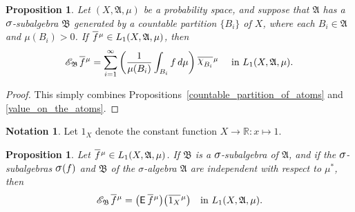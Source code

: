 \documentclass[
twoside=true,
paper=letter,
fontsize=9pt,
pagesize=auto,
leqno,
openany,
headsepline,
overfullrule,
]{scrbook}
\theoremstyle{plain}
\theoremstyle{plain}
\newtheorem{prop}[thm]{Proposition}
\theoremstyle{definition}
\newtheorem{notn}[thm]{Notation}
\theoremstyle{bfnoteitalic}
\theoremstyle{bfnoteroman}
\newcommand{\sigalg}[1]{\mathfrak{#1}}
\newcommand{\cali}[1]{\mathscr{#1}}
\newcommand{\sfop}[1]{\mathsf{#1}}
\newcommand{\expval}{\sfop{E}\,}
\newcommand{\condexpsub}[2]
{\mathop{\cali{E}\hspace{-1.5pt}}\nolimits_{#2}\hspace{-1pt}#1}
\newcommand{\sagb}{\mathop{\hbox{\large{$\sigma$}}}\nolimits}
\newcommand{\textsigma}{\hbox{\large{$\sigma$}}\kern-1pt}
\newcommand{\charfunction}[1]{\mathop{{\raisebox{2pt}{$\chi$}}_{#1}}}
\newcommand{\R}{\mathbb{R}}
\newcommand{\sigmaalgebra}{\sigalg{A}}
\newcommand{\sigmaalgebraii}{\sigalg{B}}
\newcommand{\oneonomega}{1_\measurespace}
\newcommand{\sigalgb}{\sigmaalgebraii}
\newcommand{\function}{f}
\newcommand{\measurespace}{X}
\newcommand{\mspaceelt}{x}
\newcommand{\measure}{\mu}
\newcommand*\xbar[1]{%
   \hbox{%
     \vbox{%
       \hrule height 0.4pt %
       \kern0.4ex%
       \hbox{%
         \ensuremath{#1}%
       }%
     }%
   }%
}
\newcommand{\lebclass}[1]{\hspace{.5pt}\xbar{#1}\hspace{0.5pt}}
\newcommand{\ellclass}[2]{\lebclass{#1}^{#2}}
\begin{document}
\begin{prop}\label{conditional_expectation_countable}
Let $(\measurespace, \sigmaalgebra,\measure)$ be a probability space, and suppose that $\sigmaalgebra$ has a 
$\textsigma$-subalgebra $\sigmaalgebraii$ generated by a countable partition $\{B_i\}$ of $\measurespace$, where each $B_i\in\sigmaalgebra$ and $\measure(B_i)>0$. 
If $\ellclass{\function}{\measure} \in L_1(\measurespace, \sigmaalgebra,\measure)$, then
\[
\condexpsub{\ellclass{\function}{\measure}}{\sigalgb}
=
\sum_{i=1}^{\infty}
\left(
\frac{1}{\measure(B_i)}
\int_{B_i} \function\, d\measure
\right)
\ellclass{\charfunction{B_i}}{\measure}
\quad \text{ in $L_1(\measurespace, \sigmaalgebra,\measure)$.}
\]
\end{prop}

\begin{proof}
This simply combines Propositions~\ref{countable_partition_of_atoms} and \ref{value_on_the_atoms}.
\end{proof}



\begin{notn}
Let $\oneonomega$ denote the constant function $\measurespace\to\R:\mspaceelt\mapsto 1$.
\end{notn}




\begin{prop}\label{conditional_is_expected}
Let $\ellclass{\function}{\measure}\in L_1(\measurespace, \sigmaalgebra,\measure)$.
If $\sigmaalgebraii$ is a $\textsigma$-subalgebra of $\sigmaalgebra$, and if the 
$\textsigma$-subalgebras $\sagb(\function)$ and 
$\sigmaalgebraii$ of the \textsigma-algebra $\sigmaalgebra$ are independent with respect to $\measure^*$, then
\[
\condexpsub{\ellclass{\function}{\measure}}{\sigmaalgebraii}
=  
\bigl(\expval{\ellclass{\function}{\measure}}\bigr)
\bigl(\ellclass{\oneonomega}{\measure}\bigr) 
\quad
\text{in $L_1(\measurespace, \sigmaalgebra,\measure)$.}
\]
\end{prop}
\end{document}
